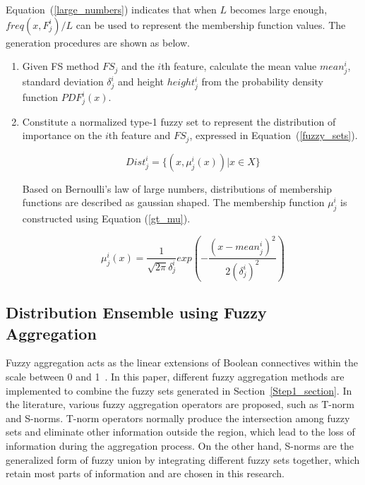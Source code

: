 \documentclass[conference]{IEEEtran}
\begin{document}
Equation~(\ref{large_numbers}) indicates that when $L$ becomes large enough, $freq(x, F^i_j)/L$ can be used to represent the membership function values. The generation procedures are shown as below.

\begin{enumerate}
	\item Given FS method $FS_j$ and the $i$th feature, calculate the mean value $mean^i_j$, standard deviation $\delta^i_j$ and height $height^i_j$ from the probability density function $PDF^i_j(x)$.
	
	\item Constitute a normalized type-1 fuzzy set to represent the distribution of importance on the $i$th feature and $FS_j$, expressed in Equation~(\ref{fuzzy_sets}).
	
	\begin{equation}~\label{fuzzy_sets}
		Dist^i_j = \{  (x, \mu^i_j(x))  | x \in X  \}
	\end{equation}
	
	Based on Bernoulli's law of large numbers, distributions of membership functions are described as gaussian shaped. The membership function $\mu^i_j$ is constructed using Equation (\ref{gt_mu}).
	
	\begin{equation}~\label{gt_mu}
		\mu^i_j(x) = \frac{1}{\sqrt{2\pi}\delta^i_j}exp(- \frac{(x-mean^i_j)^2}{2(\delta^i_j)^2})
	\end{equation}	
\end{enumerate}



\subsection{Distribution Ensemble using Fuzzy Aggregation}
Fuzzy aggregation acts as the linear extensions of Boolean connectives within the scale between 0 and 1~\cite{mesiar2018aggregation}. In this paper, different fuzzy aggregation methods are implemented to combine the fuzzy sets generated in Section~\ref{Step1_section}. In the literature, various fuzzy aggregation operators are proposed, such as T-norm and S-norms. T-norm operators normally produce the intersection among fuzzy sets and eliminate other information outside the region, which lead to the loss of information during the aggregation process. On the other hand, S-norms are the generalized form of fuzzy union by integrating different fuzzy sets together, which retain most parts of information and are chosen in this research.
\end{document}

